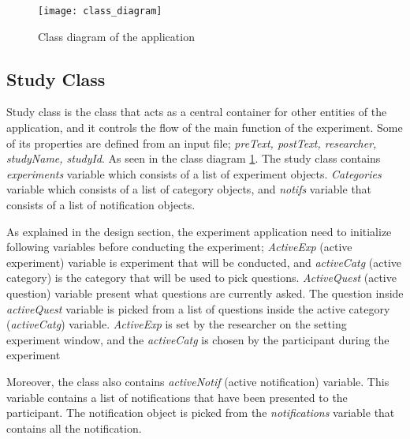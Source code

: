 \begin{figure}
\begin{center}
\texttt{[image: class\_diagram]}
\end{center}
\caption{Class diagram of the application}
\label{fig:class_diagram}
\end{figure}

\subsection{Study Class}
Study class is the class that acts as a central container for other entities of the application, and it controls the flow of the main function of the experiment.
Some of its properties are defined from an input file; \textit{preText, postText, researcher, studyName, studyId}.
As seen in the class diagram \ref{fig:class_diagram}. The study class contains \textit{experiments} variable which consists of a list of experiment objects.
 \textit{Categories} variable which consists of a list of category objects, and \textit{notifs} variable that consists of a list of notification objects.

As explained in the design section, the experiment application need to initialize following variables before conducting the experiment;
\textit{ActiveExp} (active experiment) variable is experiment that will be conducted, and \textit{activeCatg} (active category) is the
category that will be used to pick questions.
\textit{ActiveQuest} (active question) variable present what questions are currently asked.
The question inside \textit{activeQuest} variable is picked from a list of questions inside the active category (\textit{activeCatg}) variable.
\textit{ActiveExp} is set by the researcher on the setting experiment window, and the \textit{activeCatg} is chosen by the participant during the experiment




Moreover, the class also contains \textit{activeNotif} (active notification) variable.
This variable contains a list of notifications that have been presented to the participant.
The notification object is picked from the \textit{notifications} variable that contains all the notification.

